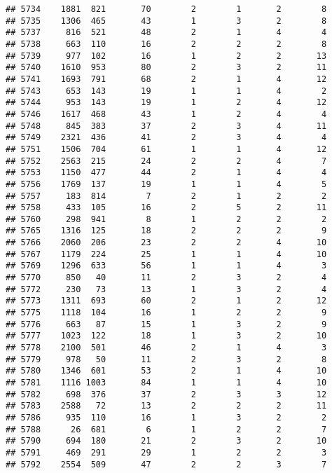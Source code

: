 \documentclass[]{article}
\begin{document}
\begin{verbatim}
## 5734    1881  821       70        2        1       2        8
## 5735    1306  465       43        1        3       2        8
## 5737     816  521       48        2        1       4        4
## 5738     663  110       16        2        2       2        8
## 5739     977  102       16        1        2       2       13
## 5740    1610  953       80        2        3       2       11
## 5741    1693  791       68        2        1       4       12
## 5743     653  143       19        1        1       4        2
## 5744     953  143       19        1        2       4       12
## 5746    1617  468       43        1        2       4        4
## 5748     845  383       37        2        3       4       11
## 5749    2321  436       41        2        3       4        4
## 5751    1506  704       61        1        1       4       12
## 5752    2563  215       24        2        2       4        7
## 5753    1150  477       44        2        1       4        4
## 5756    1769  137       19        1        1       4        5
## 5757     183  814        7        2        1       2        2
## 5758     433  105       16        2        5       2       11
## 5760     298  941        8        1        2       2        2
## 5765    1316  125       18        2        2       2        9
## 5766    2060  206       23        2        2       4       10
## 5767    1179  224       25        1        1       4       10
## 5769    1296  633       56        1        1       4        3
## 5770     850   40       11        2        3       2        4
## 5772     230   73       13        1        3       2        4
## 5773    1311  693       60        2        1       2       12
## 5775    1118  104       16        1        2       2        9
## 5776     663   87       15        1        3       2        9
## 5777    1023  122       18        1        3       2       10
## 5778    2100  501       46        2        1       4        3
## 5779     978   50       11        2        3       2        8
## 5780    1346  601       53        2        1       4       10
## 5781    1116 1003       84        1        1       4       10
## 5782     698  376       37        2        3       3       12
## 5783    2588   72       13        2        2       2       11
## 5786     935  110       16        1        3       2        2
## 5788      26  681        6        1        2       2        7
## 5790     694  180       21        2        3       2       10
## 5791     469  291       29        1        2       2        3
## 5792    2554  509       47        2        2       3        7

\end{verbatim}
\end{document}
